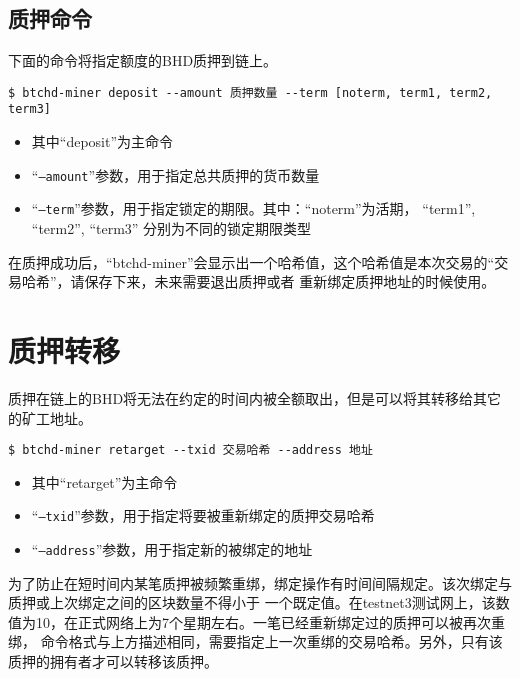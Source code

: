 \subsection{质押命令}
\begin{flushleft}
    下面的命令将指定额度的BHD质押到链上。
\end{flushleft}
\scriptsize
\begin{verbatim}
$ btchd-miner deposit --amount 质押数量 --term [noterm, term1, term2, term3]
\end{verbatim}
\normalsize
\begin{itemize}
    \item 其中``deposit''为主命令
    \item ``\texttt{--amount}''参数，用于指定总共质押的货币数量
    \item ``\texttt{--term}''参数，用于指定锁定的期限。其中：``noterm''为活期， ``term1'', ``term2'', ``term3''
        分别为不同的锁定期限类型
\end{itemize}
\begin{flushleft}
    在质押成功后，``btchd-miner''会显示出一个哈希值，这个哈希值是本次交易的``交易哈希''，请保存下来，未来需要退出质押或者
    重新绑定质押地址的时候使用。
\end{flushleft}
\section{质押转移}
\begin{flushleft}
    质押在链上的BHD将无法在约定的时间内被全额取出，但是可以将其转移给其它的矿工地址。
\end{flushleft}
\scriptsize
\begin{verbatim}
$ btchd-miner retarget --txid 交易哈希 --address 地址
\end{verbatim}
\normalsize
\begin{itemize}
    \item 其中``retarget''为主命令
    \item ``\texttt{--txid}''参数，用于指定将要被重新绑定的质押交易哈希
    \item ``\texttt{--address}''参数，用于指定新的被绑定的地址
\end{itemize}
\begin{flushleft}
    为了防止在短时间内某笔质押被频繁重绑，绑定操作有时间间隔规定。该次绑定与质押或上次绑定之间的区块数量不得小于
    一个既定值。在testnet3测试网上，该数值为10，在正式网络上为7个星期左右。一笔已经重新绑定过的质押可以被再次重绑，
    命令格式与上方描述相同，需要指定上一次重绑的交易哈希。另外，只有该质押的拥有者才可以转移该质押。
\end{flushleft}
